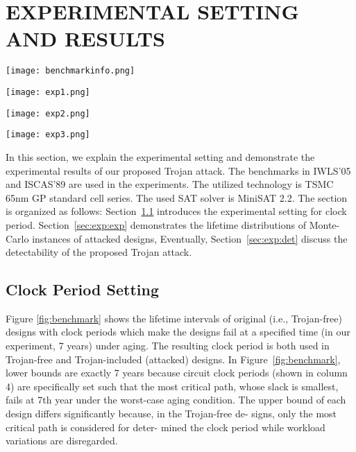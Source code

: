 \section{EXPERIMENTAL SETTING AND RESULTS}
\label{sec:mot}
\begin{figure*}
	\centering
	\texttt{[image: benchmarkinfo.png]}
	\caption{Circuit information and estimated lifetime without Trojan insertion}
	\label{fig:benchmark}
\end{figure*}
\begin{figure*}
	\texttt{[image: exp1.png]}
	\caption{Lifetime distribution of s38417 instances when it is attacked to fail at 5 year and 3 year}
	\label{fig:exp1}
\end{figure*}
\begin{figure*}
	\texttt{[image: exp2.png]}
	\caption{Lifetime distribution of des\_perf instances when it is attacked to fail at 5 year and 3 year}
	\label{fig:exp2}
\end{figure*}
\begin{figure*}
	\texttt{[image: exp3.png]}
	\caption{Lifetime distribution of leo3mp instances when it is attacked to fail at 5 year and 3 year}
	\label{fig:exp3}
\end{figure*}

In this section, we explain the experimental setting and demonstrate the experimental results of our proposed Trojan attack. The benchmarks in IWLS'05 and ISCAS'89 are used in the experiments. The utilized technology is TSMC 65nm GP standard cell series. The used SAT solver is MiniSAT 2.2. The section is organized as follows: Section~\ref{sec:exp:tc} introduces the experimental setting for clock period. Section~\ref{sec:exp:exp} demonstrates the lifetime distributions of Monte-Carlo instances of attacked designs, Eventually, Section~\ref{sec:exp:det} discuss the detectability of the proposed Trojan attack.  

\subsection{Clock Period Setting}
\label{sec:exp:tc}
Figure \ref{fig:benchmark} shows the lifetime intervals of original (i.e., Trojan-free) designs with clock periods which make the designs fail at a specified time (in our experiment, 7 years) under aging. The resulting clock period is both used in Trojan-free and Trojan-included (attacked) designs. In Figure~\ref{fig:benchmark}, lower bounds are exactly 7 years because circuit clock periods (shown in column 4) are specifically set such that the most critical path, whose slack is smallest, fails at 7th year under the worst-case aging condition. The upper bound of each design differs significantly because, in the Trojan-free de- signs, only the most critical path is considered for deter- mined the clock period while workload variations are disregarded.

